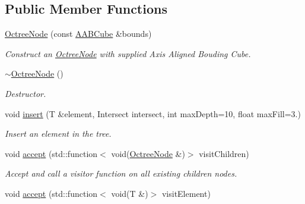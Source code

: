 \subsection*{Public Member Functions}
\begin{DoxyCompactItemize}
\item 
\hyperlink{classcpom_1_1_octree_node_af735078c73281cbb5132d61e8f2710bb}{Octree\+Node} (const \hyperlink{structcpom_1_1_a_a_b_cube}{A\+A\+B\+Cube} \&bounds)\hypertarget{classcpom_1_1_octree_node_af735078c73281cbb5132d61e8f2710bb}{}\label{classcpom_1_1_octree_node_af735078c73281cbb5132d61e8f2710bb}

\begin{DoxyCompactList}\small\item\em Construct an \hyperlink{classcpom_1_1_octree_node}{Octree\+Node} with supplied Axis Aligned Bouding Cube. \end{DoxyCompactList}\item 
\hyperlink{classcpom_1_1_octree_node_a73b4793b1683d595b2e1d1f2cc994158}{$\sim$\+Octree\+Node} ()\hypertarget{classcpom_1_1_octree_node_a73b4793b1683d595b2e1d1f2cc994158}{}\label{classcpom_1_1_octree_node_a73b4793b1683d595b2e1d1f2cc994158}

\begin{DoxyCompactList}\small\item\em Destructor. \end{DoxyCompactList}\item 
void \hyperlink{classcpom_1_1_octree_node_a5415b8c887c68a3c86a716748d237581}{insert} (T \&element, Intersect intersect, int max\+Depth=10, float max\+Fill=3.)
\begin{DoxyCompactList}\small\item\em Insert an element in the tree. \end{DoxyCompactList}\item 
void \hyperlink{classcpom_1_1_octree_node_aa28ddf7a2321e87145bfb7b5b3d4b0a7}{accept} (std\+::function$<$ void(\hyperlink{classcpom_1_1_octree_node}{Octree\+Node} \&)$>$ visit\+Children)\hypertarget{classcpom_1_1_octree_node_aa28ddf7a2321e87145bfb7b5b3d4b0a7}{}\label{classcpom_1_1_octree_node_aa28ddf7a2321e87145bfb7b5b3d4b0a7}

\begin{DoxyCompactList}\small\item\em Accept and call a visitor function on all existing children nodes. \end{DoxyCompactList}\item 
void \hyperlink{classcpom_1_1_octree_node_af24db9a094954686045ad453af5ef254}{accept} (std\+::function$<$ void(T \&)$>$ visit\+Element)\hypertarget{classcpom_1_1_octree_node_af24db9a094954686045ad453af5ef254}{}\label{classcpom_1_1_octree_node_af24db9a094954686045ad453af5ef254}


\end{DoxyCompactItemize}
